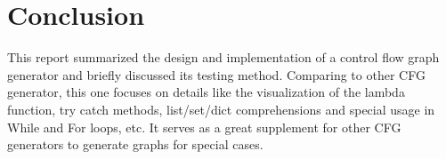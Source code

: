 \documentclass[11pt]{article}
\begin{document}
\section{Conclusion}\label{conclusion}
This report summarized the design and implementation of a control flow graph generator and briefly discussed its testing method. Comparing to other CFG generator, this one focuses on details like the visualization of the lambda function, try catch methods, list/set/dict comprehensions and special usage in While and For loops, etc. It serves as a great supplement for other CFG generators to generate graphs for special cases.
\end{document}
